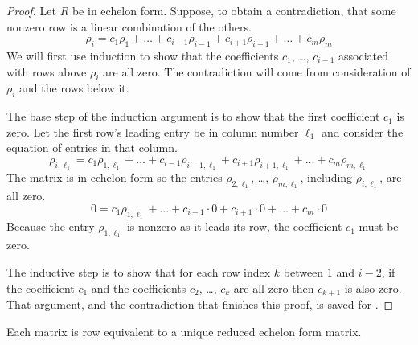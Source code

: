\begin{proof}
Let $R$ be in echelon form.
Suppose, to obtain a contradiction, that some nonzero row is a linear
combination of the others.
\begin{equation*}
   \rho_i=c_1\rho_1+\ldots+c_{i-1}\rho_{i-1}+
               c_{i+1}\rho_{i+1}+\ldots+c_m\rho_m
\end{equation*}
We will first use induction to show that the coefficients 
$c_1$, \ldots, $c_{i-1}$ associated with rows above $\rho_i$ are all zero.
The contradiction will come from consideration of $\rho_i$ and the rows below
it.

The base step of the induction argument 
is to show that the first coefficient $c_1$ is zero.
Let the first row's leading entry be in column number \( \ell_1 \) 
and consider the equation of entries in that column.
\begin{equation*}
   \rho_{i,\ell_1}=c_1\rho_{1,\ell_1}+\ldots+c_{i-1}\rho_{i-1,\ell_1}
               +c_{i+1}\rho_{i+1,\ell_1}+\ldots+c_m\rho_{m,\ell_1}
\end{equation*}
The matrix is in echelon form so the entries 
$\rho_{2,\ell_1}$, \ldots, $\rho_{m,\ell_1}$, including
$\rho_{i,\ell_1}$, are all zero. 
\begin{equation*}
   0=c_1\rho_{1,\ell_1}+\dots+c_{i-1}\cdot 0
               +c_{i+1}\cdot 0+\dots+c_m\cdot 0
\end{equation*}
Because the entry $\rho_{1,\ell_1}$ is nonzero as it leads its row,
the coefficient $c_1$ must be zero.  

The inductive step is to show that 
for each row index $k$ between $1$ and $i-2$,
if the coefficient $c_1$ and the 
coefficients $c_2$, \ldots, $c_{k}$ are all zero 
then $c_{k+1}$ is also zero.
That argument,
and the contradiction that finishes this proof, is saved for 
.
\end{proof}

\begin{theorem}
\label{th:ReducedEchelonFormIsUnique}
Each matrix is row equivalent to a unique reduced echelon form matrix.
\end{theorem}

